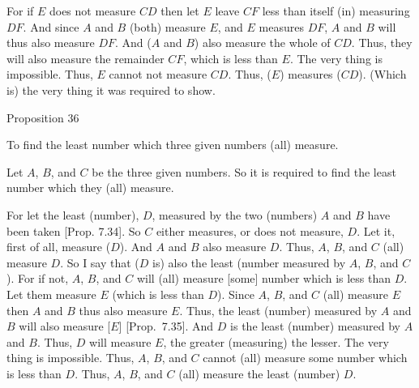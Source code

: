 For if $E$ does not measure $CD$ then let $E$ leave $CF$ less than
itself (in) measuring $DF$. And since $A$ and $B$ (both) measure $E$, and
$E$ measures $DF$, $A$ and $B$ will thus also measure $DF$. And ($A$ and $B$) also
measure the whole of $CD$. Thus, they will also measure the
remainder $CF$, which is less than $E$. The very thing is impossible. 
Thus, $E$ cannot not measure $CD$. Thus, ($E$) measures ($CD$). 
(Which is) the very thing it was required to show.


\begin{center}
{\large Proposition 36}
\end{center}

To  find the least
number which  three given numbers (all) measure.

Let $A$, $B$, and $C$ be the three given numbers. So it is required to
find the least number which they (all) measure.

\epsfysize=1.8in
\centerline{}

For let the least (number), $D$, measured by the two (numbers) $A$ and $B$
have been taken [Prop. 7.34].
So $C$ either measures, or does not measure, $D$. Let it, first of
all, measure ($D$). And $A$ and $B$ also measure $D$. Thus, $A$, $B$, and $C$
(all) measure $D$. So I say that ($D$ is) also the least (number measured by
$A$, $B$, and $C$). For if not, $A$, $B$, and $C$ will (all) measure [some]
number which is less than $D$. Let them measure $E$ (which is less than $D$).
Since $A$, $B$, and $C$ (all) measure $E$ then $A$ and $B$ thus also measure $E$.
Thus, the least (number) measured by $A$ and $B$ will also
measure [$E$] [Prop.~7.35]. And $D$
is the least (number) measured by $A$ and $B$. Thus, $D$ will measure
$E$, the greater (measuring) the lesser. The very thing is impossible.
Thus, $A$, $B$, and $C$ cannot (all) measure some number which is less than $D$.
Thus, $A$, $B$, and $C$ (all) measure the least (number) $D$.

